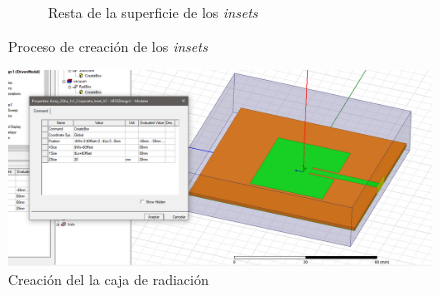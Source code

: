 \begin{figure}[p]
\begin{subfigure}[b]{0.45\textwidth}
         \caption{Resta de la superficie de los \textit{insets}}
         \label{fig:insetb}
     \end{subfigure}
     \hfill
        \caption{Proceso de creación de los \textit{insets}}
        \label{fig:insets}
\end{figure}

\begin{figure}[h!]
    \centering
        \includegraphics[width=\textwidth]{archivos/desarrollo/8}
        \caption{Creación del la caja de radiación}
        \label{fig:caja}
\end{figure}

